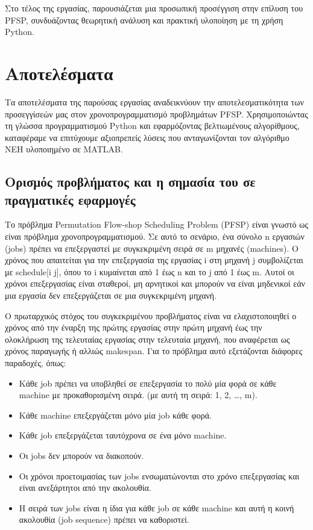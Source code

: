 \documentclass[paper=a4, fontsize=11pt]{scrartcl}
\numberwithin{equation}{section}		%
\numberwithin{figure}{section}			%
\numberwithin{table}{section}				%
\begin{document}
    Στο τέλος της εργασίας, παρουσιάζεται μια προσωπική προσέγγιση στην επίλυση του PFSP, συνδυάζοντας θεωρητική ανάλυση και πρακτική υλοποίηση με τη χρήση Python.



\section{Αποτελέσματα}
    Τα αποτελέσματα της παρούσας εργασίας αναδεικνύουν την αποτελεσματικότητα των προσεγγίσεών μας στον χρονοπρογραμματισμό προβλημάτων PFSP. Χρησιμοποιώντας τη γλώσσα προγραμματισμού Python και εφαρμόζοντας βελτιωμένους αλγορίθμους, καταφέραμε να επιτύχουμε αξιοπρεπείς λύσεις που ανταγωνίζονται τον αλγόριθμο NEH υλοποιημένο σε MATLAB.

\newpage
\subsection{Ορισμός προβλήματος και η σημασία του σε πραγματικές εφαρμογές}
    Το πρόβλημα Permutation Flow-shop Scheduling Problem (PFSP) είναι γνωστό ως είναι πρόβλημα χρονοπρογραμματισμού. Σε αυτό το σενάριο, ένα σύνολο n εργασιών (jobs) πρέπει να επεξεργαστεί με συγκεκριμένη σειρά σε m μηχανές (machines). Ο χρόνος που απαιτείται για την επεξεργασία της εργασίας i στη μηχανή j συμβολίζεται με schedule[i j], όπου το i κυμαίνεται από 1 έως n και το j από 1 έως m. Αυτοί οι χρόνοι επεξεργασίας είναι σταθεροί, μη αρνητικοί και μπορούν να είναι μηδενικοί εάν μια εργασία δεν επεξεργάζεται σε μια συγκεκριμένη μηχανή.
    
    Ο πρωταρχικός στόχος του συγκεκριμένου προβλήματος είναι να ελαχιστοποιηθεί ο χρόνος από την έναρξη της πρώτης εργασίας στην πρώτη μηχανή έως την ολοκλήρωση της τελευταίας εργασίας στην τελευταία μηχανή, που αναφέρεται ως χρόνος παραγωγής ή αλλιώς makespan. Για το πρόβλημα αυτό εξετάζονται διάφορες παραδοχές, όπως:

\begin{itemize}
  \item Κάθε job πρέπει να υποβληθεί σε επεξεργασία το πολύ μία φορά σε κάθε machine με προκαθορισμένη σειρά. (με αυτή τη σειρά: 1, 2, …, m). 
  \item Κάθε machine επεξεργάζεται μόνο μία job κάθε φορά.
  \item Κάθε job επεξεργάζεται ταυτόχρονα σε ένα μόνο machine.
  \item Οι jobs δεν μπορούν να διακοπούν.
  \item Οι χρόνοι προετοιμασίας των jobs ενσωματώνονται στο χρόνο επεξεργασίας και είναι ανεξάρτητοι από την ακολουθία.
  \item Η σειρά των jobs είναι η ίδια για κάθε job σε κάθε machine και αυτή η κοινή ακολουθία (job sequence) πρέπει να καθοριστεί.
\end{itemize}
\end{document}
